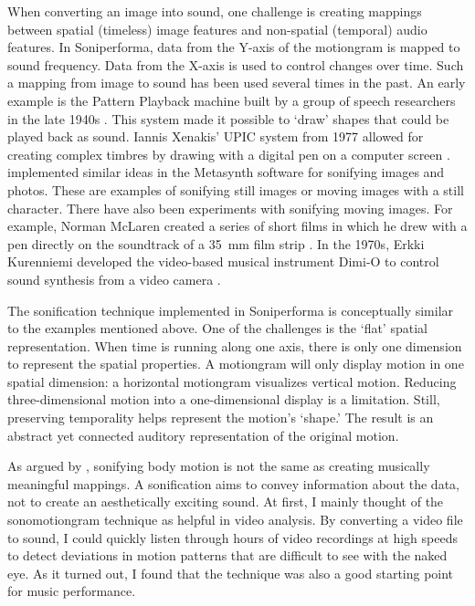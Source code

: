 When converting an image into sound, one challenge is creating mappings between spatial (timeless) image features and non-spatial (temporal) audio features. In Soniperforma, data from the Y-axis of the motiongram is mapped to sound frequency. Data from the X-axis is used to control changes over time. Such a mapping from image to sound has been used several times in the past. An early example is the Pattern Playback machine built by a group of speech researchers in the late 1940s \citep{cooper_interconversion_1951}. This system made it possible to `draw' shapes that could be played back as sound. Iannis Xenakis' UPIC system from 1977 allowed for creating complex timbres by drawing with a digital pen on a computer screen \citep{marino_upic_1993}.  \citet{wenger_communities_1998} implemented similar ideas in the Metasynth software for sonifying images and photos.
These are examples of sonifying still images or moving images with a still character. There have also been experiments with sonifying moving images. For example, Norman McLaren created a series of short films in which he drew with a pen directly on the soundtrack of a 35~mm film strip \citep{jordan_norman_1953}. In the 1970s, Erkki Kurenniemi developed the video-based musical instrument Dimi-O to control sound synthesis from a video camera \citep{ojanen_design_2007}.

The sonification technique implemented in Soniperforma is conceptually similar to the examples mentioned above. One of the challenges is the `flat' spatial representation. When time is running along one axis, there is only one dimension to represent the spatial properties. A motiongram will only display motion in one spatial dimension: a horizontal motiongram visualizes vertical motion. Reducing three-dimensional motion into a one-dimensional display is a limitation. Still, preserving temporality helps represent the motion's `shape.' The result is an abstract yet connected auditory representation of the original motion.

As argued by \citet{winters_sonification_2012}, sonifying body motion is not the same as creating musically meaningful mappings. A sonification aims to convey information about the data, not to create an aesthetically exciting sound. At first, I mainly thought of the sonomotiongram technique as helpful in video analysis. By converting a video file to sound, I could quickly listen through hours of video recordings at high speeds to detect deviations in motion patterns that are difficult to see with the naked eye. As it turned out, I found that the technique was also a good starting point for music performance.

